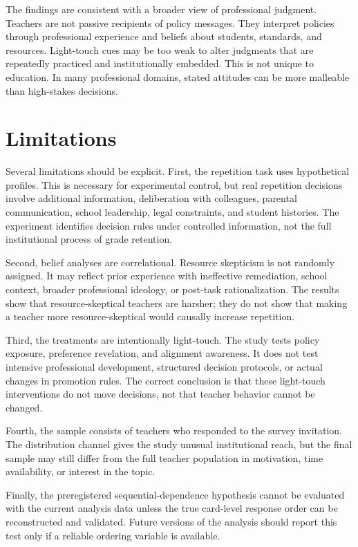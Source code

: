 \documentclass[12pt,a4paper]{article}
\begin{document}
The findings are consistent with a broader view of professional judgment. Teachers are not passive recipients of policy messages. They interpret policies through professional experience and beliefs about students, standards, and resources. Light-touch cues may be too weak to alter judgments that are repeatedly practiced and institutionally embedded. This is not unique to education. In many professional domains, stated attitudes can be more malleable than high-stakes decisions.

\section{Limitations}

Several limitations should be explicit. First, the repetition task uses hypothetical profiles. This is necessary for experimental control, but real repetition decisions involve additional information, deliberation with colleagues, parental communication, school leadership, legal constraints, and student histories. The experiment identifies decision rules under controlled information, not the full institutional process of grade retention.

Second, belief analyses are correlational. Resource skepticism is not randomly assigned. It may reflect prior experience with ineffective remediation, school context, broader professional ideology, or post-task rationalization. The results show that resource-skeptical teachers are harsher; they do not show that making a teacher more resource-skeptical would causally increase repetition.

Third, the treatments are intentionally light-touch. The study tests policy exposure, preference revelation, and alignment awareness. It does not test intensive professional development, structured decision protocols, or actual changes in promotion rules. The correct conclusion is that these light-touch interventions do not move decisions, not that teacher behavior cannot be changed.

Fourth, the sample consists of teachers who responded to the survey invitation. The distribution channel gives the study unusual institutional reach, but the final sample may still differ from the full teacher population in motivation, time availability, or interest in the topic.

Finally, the preregistered sequential-dependence hypothesis cannot be evaluated with the current analysis data unless the true card-level response order can be reconstructed and validated. Future versions of the analysis should report this test only if a reliable ordering variable is available.
\end{document}
